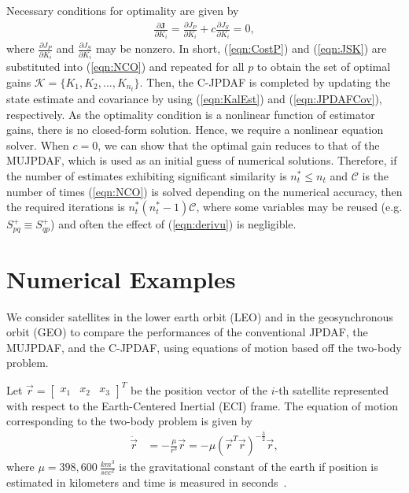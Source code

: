 \documentclass[letterpaper, paper,10pt]{AAS}		%
\newcommand{\refeqn}[1]{(\ref{eqn:#1})}
\newcommand{\deriv}[2]{\ensuremath{\frac{\partial #1}{\partial #2}}}
\begin{document}
Necessary conditions for optimality are given by
\begin{align}
\deriv{\mathbf{J}}{K_i} = \deriv{J_P}{K_i} + c \deriv{J_S}{K_i} =0,\label{eqn:NCO}
\end{align}
where $\deriv{J_P}{K_i}$ and $\deriv{J_S}{K_i}$ may be nonzero.
In short, \refeqn{CostP} and \refeqn{JSK} are substituted into \refeqn{NCO} and repeated for all $p$ to obtain the set of optimal gains $\mathcal{K}=\{K_1,K_2,...,K_{n_t}\}$.
Then, the C-JPDAF is completed by updating the state estimate and covariance by using \refeqn{KalEst} and \refeqn{JPDAFCov}, respectively.
As the optimality condition is a nonlinear function of estimator gains, there is no closed-form solution.
Hence, we require a nonlinear equation solver.
When $c=0$, we can show that the optimal gain reduces to that of the MUJPDAF, which is used as an initial guess of numerical solutions.
Therefore, if the number of estimates exhibiting significant similarity is $n_t^*\leq n_t$ and $\mathcal C$ is the number of times \refeqn{NCO} is solved depending on the numerical accuracy, then the required iterations is $n_t^*(n_t^*-1)\mathcal C$, where some variables may be reused (e.g. $S^+_{pq}\equiv S^+_{qp}$) and often the effect of \refeqn{derivu} is negligible.





\section{Numerical Examples}

We consider satellites in the lower earth orbit (LEO) and in the geosynchronous orbit (GEO) to compare the performances of the conventional JPDAF, the MUJPDAF, and the C-JPDAF, using equations of motion based off the two-body problem.

Let $\vec r=\begin{bmatrix}x_1 & x_2 & x_3\end{bmatrix}^T$ be the position vector of the $i$-th satellite represented with respect to the Earth-Centered Inertial (ECI) frame.
The equation of motion corresponding to the two-body problem is given by
\begin{align}
\ddot{\vec r}&=-\frac{\mu}{r^3}\vec r=-\mu(\vec r^T\vec r)^{-\frac32}\vec r,
\end{align}
where $\mu=398,600\ \frac{km^3}{sec^2}$ is the gravitational constant of the earth if position is estimated in kilometers and time is measured in seconds~\cite{Val01}.
\end{document}

